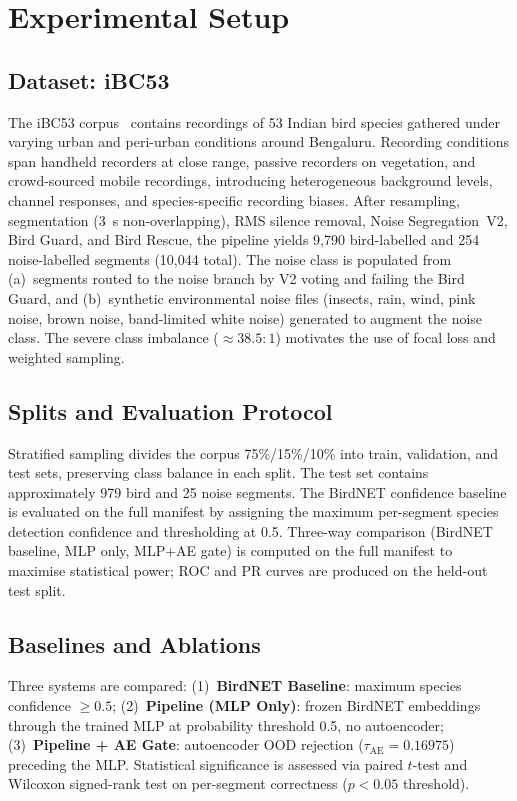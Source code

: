 \documentclass[conference]{IEEEtran}
\begin{document}
\section{Experimental Setup}

\subsection{Dataset: iBC53}
The iBC53 corpus~\cite{iBC53} contains recordings of 53 Indian bird species gathered under varying urban and peri-urban conditions around Bengaluru. Recording conditions span handheld recorders at close range, passive recorders on vegetation, and crowd-sourced mobile recordings, introducing heterogeneous background levels, channel responses, and species-specific recording biases. After resampling, segmentation (3~s non-overlapping), RMS silence removal, Noise Segregation~V2, Bird Guard, and Bird Rescue, the pipeline yields 9,790 bird-labelled and 254 noise-labelled segments (10,044 total). The noise class is populated from (a)~segments routed to the noise branch by V2 voting and failing the Bird Guard, and (b)~synthetic environmental noise files (insects, rain, wind, pink noise, brown noise, band-limited white noise) generated to augment the noise class. The severe class imbalance ($\approx 38.5:1$) motivates the use of focal loss and weighted sampling.

\subsection{Splits and Evaluation Protocol}
Stratified sampling divides the corpus 75\%/15\%/10\% into train, validation, and test sets, preserving class balance in each split. The test set contains approximately 979 bird and 25 noise segments. The BirdNET confidence baseline is evaluated on the full manifest by assigning the maximum per-segment species detection confidence and thresholding at 0.5. Three-way comparison (BirdNET baseline, MLP only, MLP+AE gate) is computed on the full manifest to maximise statistical power; ROC and PR curves are produced on the held-out test split.

\subsection{Baselines and Ablations}
Three systems are compared: (1)~\textbf{BirdNET Baseline}: maximum species confidence $\geq 0.5$; (2)~\textbf{Pipeline (MLP Only)}: frozen BirdNET embeddings through the trained MLP at probability threshold 0.5, no autoencoder; (3)~\textbf{Pipeline + AE Gate}: autoencoder OOD rejection ($\tau_\text{AE}=0.16975$) preceding the MLP. Statistical significance is assessed via paired $t$-test and Wilcoxon signed-rank test on per-segment correctness ($p < 0.05$ threshold).
\end{document}
